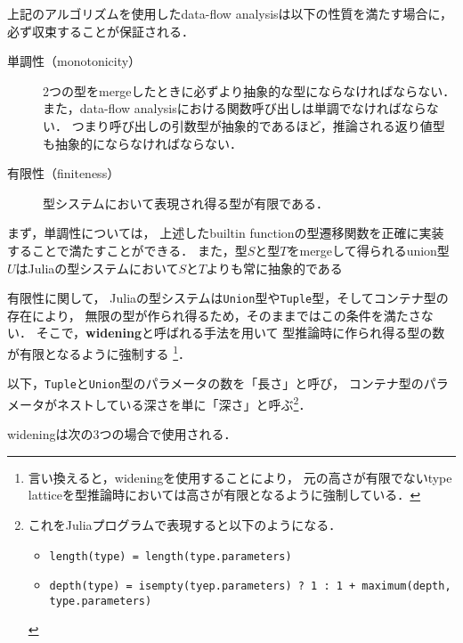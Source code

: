 上記のアルゴリズムを使用したdata-flow analysisは以下の性質を満たす場合に，
必ず収束することが保証される\cite{graph-free-data-flow-analysis, jameson}．

\begin{description}
  \item [単調性（monotonicity）]
        2つの型をmergeしたときに必ずより抽象的な型にならなければならない．
        また，data-flow analysisにおける関数呼び出しは単調でなければならない．
        つまり呼び出しの引数型が抽象的であるほど，推論される返り値型も抽象的にならなければならない．
  \item [有限性（finiteness）] 型システムにおいて表現され得る型が有限である．
\end{description}

まず，単調性については，
上述したbuiltin functionの型遷移関数を正確に実装することで満たすことができる．
また，型\(S\)と型\(T\)をmergeして得られるunion型\(U\)はJuliaの型システムにおいて\(S\)と\(T\)よりも常に抽象的である

有限性に関して，
Juliaの型システムは\verb|Union|型や\verb|Tuple|型，そしてコンテナ型の存在により，
無限の型が作られ得るため，そのままではこの条件を満たさない．
そこで，\textbf{widening}と呼ばれる手法を用いて
型推論時に作られ得る型の数が有限となるように強制する
\footnote{
  言い換えると，wideningを使用することにより，
  元の高さが有限でないtype latticeを型推論時においては高さが有限となるように強制している．
}．

以下，\verb|Tuple|と\verb|Union|型のパラメータの数を「長さ」と呼び，
コンテナ型のパラメータがネストしている深さを単に「深さ」と呼ぶ\footnote{
  これをJuliaプログラムで表現すると以下のようになる．
  \begin{itemize}
    \item \texttt{length(type) = length(type.parameters)}
    \item \texttt{depth(type) = isempty(tyep.parameters) ? 1 : 1 + maximum(depth, type.parameters)}
  \end{itemize}
}．

wideningは次の3つの場合で使用される．

